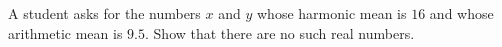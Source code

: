 A student asks for the numbers $x$ and $y$ whose harmonic mean is $16$ and whose arithmetic mean is $9.5$. Show that there are no such real numbers.
